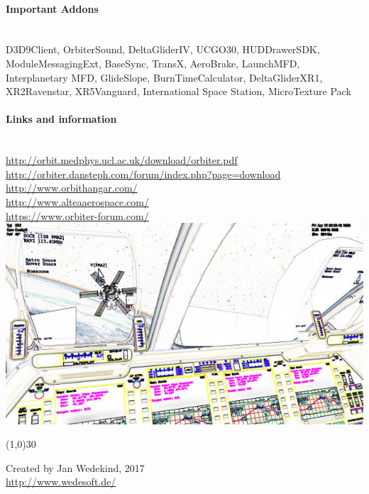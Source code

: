 \documentclass[11pt]{scrartcl} %
\newcommand{\sectiontitle}[1]{\paragraph{#1} \ \\} %
\begin{document}
\begin{minipage}[t]{64mm}
\sectiontitle{Important Addons}
D3D9Client,
OrbiterSound,
DeltaGliderIV,
UCGO30,
HUDDrawerSDK,
ModuleMessagingExt,
BaseSync,
TransX,
AeroBrake,
LaunchMFD,
Interplanetary MFD,
GlideSlope,
BurnTimeCalculator,
DeltaGliderXR1,
XR2Ravenstar,
XR5Vanguard,
International Space Station,
MicroTexture Pack\\

\vspace{\baselineskip}
\sectiontitle{Links and information}
\url{http://orbit.medphys.ucl.ac.uk/download/orbiter.pdf}\medskip\\
\url{http://orbiter.dansteph.com/forum/index.php?page=download}\medskip\\
\url{http://www.orbithangar.com/}\medskip\\
\url{http://www.alteaaerospace.com/}\medskip\\
\url{https://www.orbiter-forum.com/}\medskip\\

\includegraphics[width=\textwidth]{docking}

\linethickness{0.5mm} %
{\color{mygray}\line(1,0){30}} %

\footnotesize{
Created by Jan Wedekind, 2017\\
\url{http://www.wedesoft.de/}\\
}

\end{minipage} %
\end{document}
